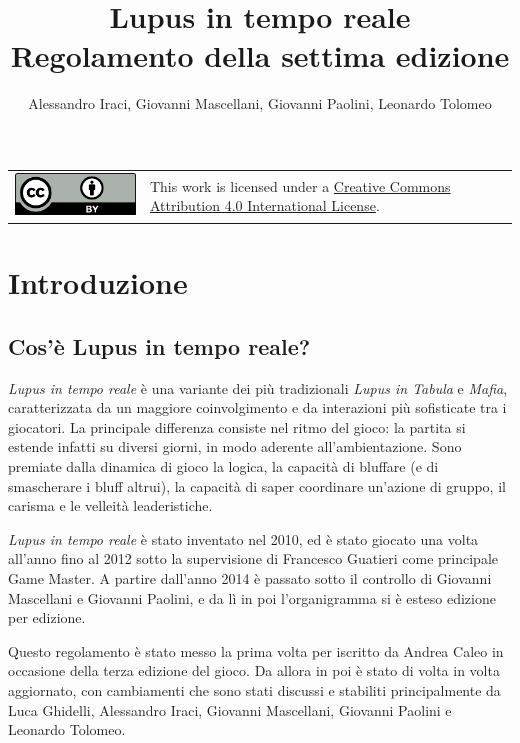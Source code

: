 \documentclass[a4paper,10pt]{article}
\title{Lupus in tempo reale\\ Regolamento della settima edizione}
\author{Alessandro Iraci, Giovanni Mascellani, Giovanni Paolini, Leonardo Tolomeo}
\begin{document}
	
\maketitle

\begin{tabular}{lp{}}
	\begin{minipage}{0.22\textwidth}
		\vspace{3mm}
		\href{http://creativecommons.org/licenses/by/4.0/}{\includegraphics{ccby.pdf}}
	\end{minipage}
	&
	This work is licensed under a \href{http://creativecommons.org/licenses/by/4.0/}{Creative Commons Attribution 4.0 International License}.
\end{tabular}


\section{Introduzione}

\subsection{Cos'è Lupus in tempo reale?}

\emph{Lupus in tempo reale} è una variante dei più tradizionali \emph{Lupus in Tabula} e \emph{Mafia}, caratterizzata da un maggiore coinvolgimento e da interazioni più sofisticate tra i giocatori.
La principale differenza consiste nel ritmo del gioco: la partita si estende infatti su diversi giorni, in modo aderente all'ambientazione.
Sono premiate dalla dinamica di gioco la logica, la capacità di bluffare (e di smascherare i bluff altrui), la capacità di saper coordinare un’azione di gruppo, il carisma e le velleità leaderistiche.

\emph{Lupus in tempo reale} è stato inventato nel 2010, ed è stato giocato una volta all'anno fino al 2012 sotto la supervisione di Francesco Guatieri come principale Game Master. A partire dall'anno 2014 è passato sotto il controllo di Giovanni Mascellani e Giovanni Paolini, e da lì in poi l'organigramma si è esteso edizione per edizione.

Questo regolamento è stato messo la prima volta per iscritto da Andrea Caleo in occasione della terza edizione del gioco. Da allora in poi è stato di volta in volta aggiornato, con cambiamenti che sono stati discussi e stabiliti principalmente da Luca Ghidelli, Alessandro Iraci, Giovanni Mascellani, Giovanni Paolini e Leonardo Tolomeo.
\end{document}
